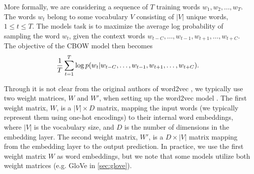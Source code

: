 More formally, we are considering a sequence of $T$ training words $w_1, w_2, \ldots, w_T$. The words $w_t$ belong to some vocabulary $V$ consisting of $|V|$ unique words, $1 \leq t \leq T$. The models task is to maximize the average log probability of sampling the word $w_t$, given the context words $w_{t-C}, \ldots, w_{t-1}, w_{t+1}, \ldots, w_{t+C}$. The objective of the CBOW model then becomes
\begin{align}
    \frac{1}{T} \sum\limits_{t=1}^{T} \log p(w_t | w_{t-C}, \ldots, w_{t-1}, w_{t+1}, \ldots, w_{t+C}).
    \label{eqn:cbow-objective-function}
\end{align}

Through it is not clear from the original authors of word2vec \cite{mikolov2013a, mikolov2013b}, we typically use two weight matrices, $W$ and $W'$, when setting up the word2vec model \cite{rong2016word2vec}. The first weight matrix, $W$, is a $|V| \times D$ matrix, mapping the input words (we typically represent them using one-hot encodings) to their internal word embeddings, where $|V|$ is the vocabulary size, and $D$ is the number of dimensions in the embedding layer. The second weight matrix, $W'$, is a $D \times |V|$ matrix mapping from the embedding layer to the output prediction. In practice, we use the first weight matrix $W$ as word embeddings, but we note that some models utilize both weight matrices (e.g. GloVe in \cref{sec:glove}).

